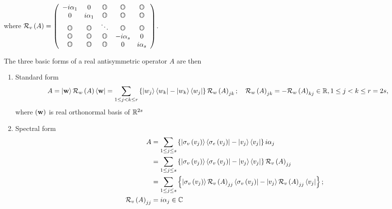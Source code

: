 where ${\cal R}_{v}\left( A\right) =\left( 
\begin{array}{ccccc}
-i\alpha _{1} & 0 & {\Bbb O} & {\Bbb O} & {\Bbb O} \\ 
0 & i\alpha _{1} & {\Bbb O} & {\Bbb O} & {\Bbb O} \\ 
{\Bbb O} & {\Bbb O} & \ddots & {\Bbb O} & {\Bbb O} \\ 
{\Bbb O} & {\Bbb O} & {\Bbb O} & -i\alpha _{s} & 0 \\ 
{\Bbb O} & {\Bbb O} & {\Bbb O} & 0 & i\alpha _{s}%
\end{array}%
\right) $.

\begin{remark}
The three basic forms of a real antisymmetric operator $A$ are then

\begin{enumerate}
\item Standard form 
\[
A=\left\vert {\bf w}\right\rangle {\cal R}_{w}\left( A\right) \left\langle 
{\bf w}\right\vert =\sum_{1\leq j<k\leq r}\left\{ \left\vert
w_{j}\right\rangle \left\langle w_{k}\right\vert -\left\vert
w_{k}\right\rangle \left\langle w_{j}\right\vert \right\} {\cal R}_{w}\left(
A\right) _{jk};\quad {\cal R}_{w}\left( A\right) _{jk}=-{\cal R}_{w}\left(
A\right) _{kj}\in {\Bbb R},1\leq j<k\leq r=2s, 
\]%
where $\left( {\bf w}\right) $ is real orthonormal basis of ${\Bbb R}^{2s}$

\item Spectral form 
\begin{align}
A& =\sum_{1\leq j\leq s}\left\{ \left\vert \sigma _{v}\left( v_{j}\right)
\right\rangle \left\langle \sigma _{e}\left( v_{j}\right) \right\vert
-\left\vert v_{j}\right\rangle \left\langle v_{j}\right\vert \right\}
i\alpha _{j} \\
& =\sum_{1\leq j\leq s}\left\{ \left\vert \sigma _{v}\left( v_{j}\right)
\right\rangle \left\langle \sigma _{v}\left( v_{j}\right) \right\vert
-\left\vert v_{j}\right\rangle \left\langle v_{j}\right\vert \right\} {\cal R%
}_{v}\left( A\right) _{jj} \\
\qquad & =\sum_{1\leq j\leq s}\left\{ \left\vert \sigma _{v}\left(
v_{j}\right) \right\rangle {\cal R}_{v}\left( A\right) _{jj}\left\langle
\sigma _{v}\left( v_{j}\right) \right\vert -\left\vert v_{j}\right\rangle 
{\cal R}_{v}\left( A\right) _{jj}\left\langle v_{j}\right\vert \right\} ; \\
\qquad {\cal R}_{v}\left( A\right) _{jj}& =i\alpha _{j}\in {\Bbb C}
\end{align}


\end{enumerate}
\end{remark}
